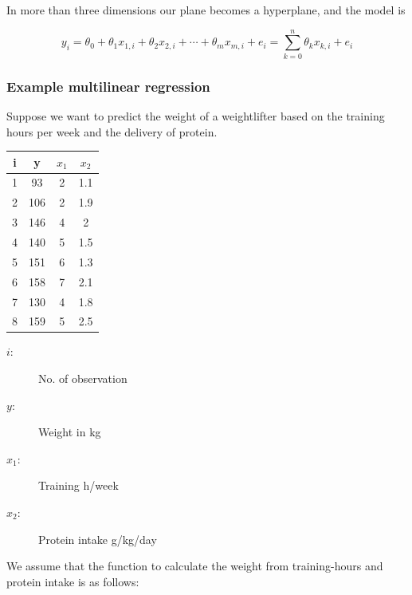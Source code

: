 \documentclass[11pt]{article}
\renewcommand*{\thead}[1]{\bfseries #1}
\begin{document}
In more than three dimensions our plane becomes a hyperplane, and the model is

\begin{equation*}
    y_i = \theta_0 + \theta_1 x_{1,i} + \theta_2 x_{2,i} + \cdots + \theta_m x_{m,i}  + e_i=\sum_{k=0}^{n}\theta_k x_{k,i} + e_i
\end{equation*}

\subsubsection{Example multilinear regression}

Suppose we want to predict the weight of a weightlifter based on the training hours per week and the delivery of protein.

\vspace{10px}

\begin{minipage}{0.25\textwidth}
    \begin{tabular}{cccc}
        \toprule
        \thead{i} & \thead{y} & \thead{$x_1$} & \thead{$x_2$} \\
        \hline
        1         & 93        & 2             & 1.1           \\
        \hline
        2         & 106       & 2             & 1.9           \\
        \hline
        3         & 146       & 4             & 2             \\
        \hline
        4         & 140       & 5             & 1.5           \\
        \hline
        5         & 151       & 6             & 1.3           \\
        \hline
        6         & 158       & 7             & 2.1           \\
        \hline
        7         & 130       & 4             & 1.8           \\
        \hline
        8         & 159       & 5             & 2.5           \\
        \bottomrule
    \end{tabular}
\end{minipage}\hfill
\begin{minipage}{0.75\textwidth}
    \begin{description}
        \item[$i$: ] No. of observation
        \item[$y$: ] Weight in kg
        \item[$x_1$: ] Training h/week
        \item[$x_2$: ] Protein intake g/kg/day
    \end{description}

    We assume that the function to calculate the weight from training-hours and protein intake is as follows:
\end{minipage}
\end{document}
